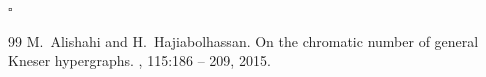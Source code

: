 \documentclass[11pt]{amsart}
\theoremstyle{definition}
\begin{document}
\hfill$\square$

\begin{thebibliography}{99}
M.~Alishahi and H.~Hajiabolhassan.
\newblock On the chromatic number of general {K}neser hypergraphs.
, 115:186 -- 209,
  2015.
\end{thebibliography}
\end{document}
